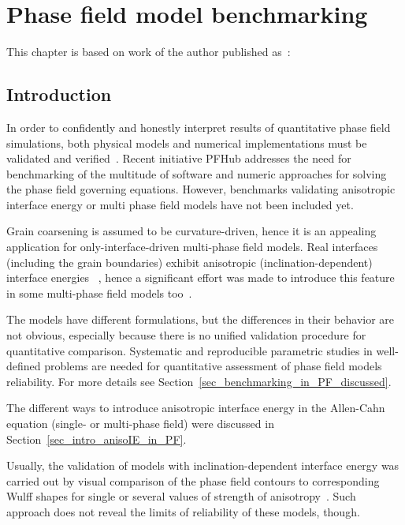 \chapter{Phase field model benchmarking}
\label{ch_paper1}
This chapter is based on work of the author published as~\cite{Minar2022}: 

\section{Introduction}
\label{sec_P1_Intro}
In order to confidently and honestly interpret results of quantitative phase field simulations, both physical models and numerical implementations must be validated and verified~\cite{Jokisaari2017}. Recent initiative PFHub addresses the need for benchmarking of the multitude of software and numeric approaches for solving the phase field governing equations. However, benchmarks validating anisotropic interface energy or multi phase field models have not been included yet.

Grain coarsening is assumed to be curvature-driven, hence it is an appealing application for only-interface-driven multi-phase field models. Real interfaces (including the grain boundaries) exhibit anisotropic (inclination-dependent) interface energies ~\cite{Olmsted2009,Bulatov2014}, hence a significant effort was made to introduce this feature in some multi-phase field models too~\cite{Garcke1999,Toth2015,Salama2020,Kazaryan2000,Wendler2011}.

The models have different formulations, but the differences in their behavior are not obvious, especially because there is no unified validation procedure for quantitative comparison. Systematic and reproducible parametric studies in well-defined problems are needed for quantitative assessment of phase field models reliability. For more details see Section~\ref{sec_benchmarking_in_PF_discussed}.

The different ways to introduce anisotropic interface energy in the Allen-Cahn equation (single- or multi-phase field) were discussed in Section~\ref{sec_intro_anisoIE_in_PF}.

Usually, the validation of models with inclination-dependent interface energy was carried out by visual comparison of the phase field contours to corresponding Wulff shapes for single or several values of strength of anisotropy~\cite{Garcke1999,Eggleston2001,Fleck2011,Ma2006,Tschukin2017}. Such approach does not reveal the limits of reliability of these models, though.

